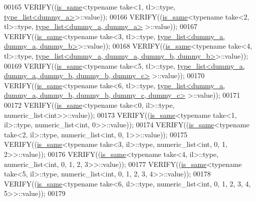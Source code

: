 \begin{DoxyCode}
00165   VERIFY((\hyperlink{struct_eigen_1_1internal_1_1is__same}{is\_same}<\textcolor{keyword}{typename} take<1, tl>::type, \hyperlink{struct_eigen_1_1internal_1_1type__list}{type\_list<dummy\_a>}>::value));
00166   VERIFY((\hyperlink{struct_eigen_1_1internal_1_1is__same}{is\_same}<\textcolor{keyword}{typename} take<2, tl>::type, \hyperlink{struct_eigen_1_1internal_1_1type__list}{type\_list<dummy\_a, dummy\_a>}
      >::value));
00167   VERIFY((\hyperlink{struct_eigen_1_1internal_1_1is__same}{is\_same}<\textcolor{keyword}{typename} take<3, tl>::type, 
      \hyperlink{struct_eigen_1_1internal_1_1type__list}{type\_list<dummy\_a, dummy\_a, dummy\_b>}>::value));
00168   VERIFY((\hyperlink{struct_eigen_1_1internal_1_1is__same}{is\_same}<\textcolor{keyword}{typename} take<4, tl>::type, 
      \hyperlink{struct_eigen_1_1internal_1_1type__list}{type\_list<dummy\_a, dummy\_a, dummy\_b, dummy\_b>}>::value));
00169   VERIFY((\hyperlink{struct_eigen_1_1internal_1_1is__same}{is\_same}<\textcolor{keyword}{typename} take<5, tl>::type, 
      \hyperlink{struct_eigen_1_1internal_1_1type__list}{type\_list<dummy\_a, dummy\_a, dummy\_b, dummy\_b, dummy\_c>}
      >::value));
00170   VERIFY((\hyperlink{struct_eigen_1_1internal_1_1is__same}{is\_same}<\textcolor{keyword}{typename} take<6, tl>::type, 
      \hyperlink{struct_eigen_1_1internal_1_1type__list}{type\_list<dummy\_a, dummy\_a, dummy\_b, dummy\_b, dummy\_c, dummy\_c>}
      >::value));
00171 
00172   VERIFY((\hyperlink{struct_eigen_1_1internal_1_1is__same}{is\_same}<\textcolor{keyword}{typename} take<0, il>::type, numeric\_list<int>>::value));
00173   VERIFY((\hyperlink{struct_eigen_1_1internal_1_1is__same}{is\_same}<\textcolor{keyword}{typename} take<1, il>::type, numeric\_list<int, 0>>::value));
00174   VERIFY((\hyperlink{struct_eigen_1_1internal_1_1is__same}{is\_same}<\textcolor{keyword}{typename} take<2, il>::type, numeric\_list<int, 0, 1>>::value));
00175   VERIFY((\hyperlink{struct_eigen_1_1internal_1_1is__same}{is\_same}<\textcolor{keyword}{typename} take<3, il>::type, numeric\_list<int, 0, 1, 2>>::value));
00176   VERIFY((\hyperlink{struct_eigen_1_1internal_1_1is__same}{is\_same}<\textcolor{keyword}{typename} take<4, il>::type, numeric\_list<int, 0, 1, 2, 3>>::value));
00177   VERIFY((\hyperlink{struct_eigen_1_1internal_1_1is__same}{is\_same}<\textcolor{keyword}{typename} take<5, il>::type, numeric\_list<int, 0, 1, 2, 3, 4>>::value));
00178   VERIFY((\hyperlink{struct_eigen_1_1internal_1_1is__same}{is\_same}<\textcolor{keyword}{typename} take<6, il>::type, numeric\_list<int, 0, 1, 2, 3, 4, 5>>::value));
00179   

\end{DoxyCode}
